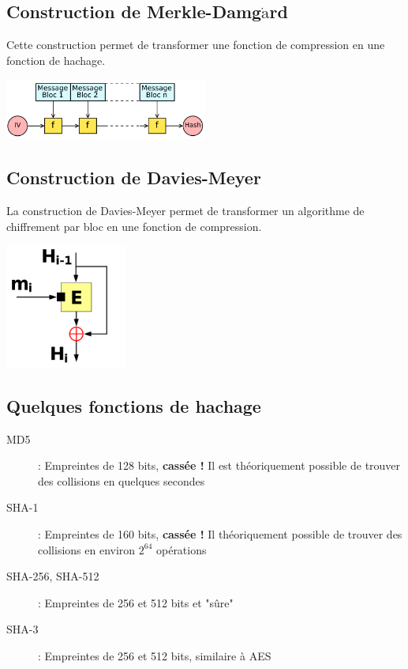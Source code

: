 \documentclass[11pt,a4paper]{report}
\begin{document}
\subsection{Construction de Merkle-Damg$\dot{\text{a}}$rd}

Cette construction permet de transformer une fonction de compression en une fonction de hachage.

\begin{center}
    \includegraphics[width=0.5\textwidth]{img/merkle_damgard.png}
\end{center}

\subsection{Construction de Davies-Meyer}

La construction de Davies-Meyer permet de transformer un algorithme de chiffrement par bloc en une fonction de compression.

\begin{center}
    \includegraphics[width=0.3\textwidth]{img/davies_meyer.png}
\end{center}

\subsection{Quelques fonctions de hachage}

\begin{description}
    \item[MD5] : Empreintes de 128 bits, \textbf{cassée ! } Il est théoriquement possible de trouver des collisions en quelques secondes
    \item[SHA-1] : Empreintes de 160 bits, \textbf{cassée ! } Il théoriquement possible de trouver des collisions en environ $2^64$ opérations
    \item[SHA-256, SHA-512] : Empreintes de 256 et 512 bits et "sûre"
    \item[SHA-3] : Empreintes de 256 et 512 bits, similaire à AES
\end{description}
\end{document}
